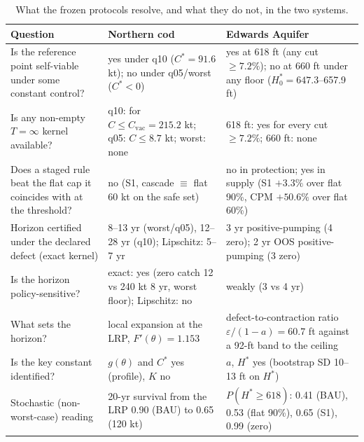 \begin{table}[t]
\centering
\caption{What the frozen protocols resolve, and what they do not, in the two systems.}
\label{tab:resolved}
\small
\begin{tabular}{p{}p{}p{}}
\toprule
Question & Northern cod & Edwards Aquifer \\
\midrule
Is the reference point self-viable under some constant control? & yes under q10 ($C^*=91.6$ kt); no under q05/worst ($C^*<0$) & yes at 618 ft (any cut $\ge 7.2\%$); no at 660 ft under any floor ($H^*_0=647.3$--657.9 ft) \\
Is any non-empty $T=\infty$ kernel available? & q10: for $C\le C_{\mathrm{vac}}=215.2$ kt; q05: $C\le 8.7$ kt; worst: none & 618 ft: yes for every cut $\ge 7.2\%$; 660 ft: none \\
Does a staged rule beat the flat cap it coincides with at the threshold? & no (S1, cascade $\equiv$ flat 60 kt on the safe set) & no in protection; yes in supply (S1 $+3.3\%$ over flat 90\%, CPM $+50.6\%$ over flat 60\%) \\
Horizon certified under the declared defect (exact kernel) & 8--13 yr (worst/q05), 12--28 yr (q10); Lipschitz: 5--7 yr & 3 yr positive-pumping (4 zero); 2 yr OOS positive-pumping (3 zero) \\
Is the horizon policy-sensitive? & exact: yes (zero catch 12 vs 240 kt 8 yr, worst floor); Lipschitz: no & weakly (3 vs 4 yr) \\
What sets the horizon? & local expansion at the LRP, $F'(\theta)=1.153$ & defect-to-contraction ratio $\varepsilon/(1-a)=60.7$ ft against a 92-ft band to the ceiling \\
Is the key constant identified? & $g(\theta)$ and $C^*$ yes (profile), $K$ no & $a$, $H^*$ yes (bootstrap SD 10--13 ft on $H^*$) \\
Stochastic (non-worst-case) reading & 20-yr survival from the LRP 0.90 (BAU) to 0.65 (120 kt) & $P(H^*\ge618)$: 0.41 (BAU), 0.53 (flat 90\%), 0.65 (S1), 0.99 (zero) \\
\bottomrule
\end{tabular}
\end{table}
